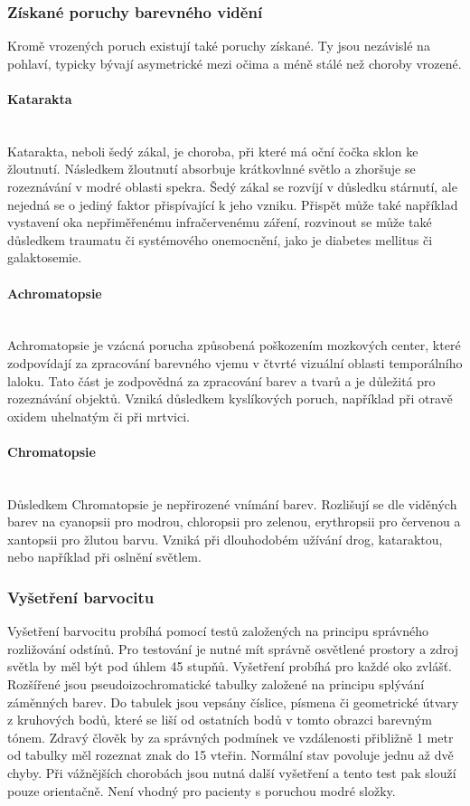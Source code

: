 \subsubsection{Získané poruchy barevného vidění}
Kromě vrozených poruch existují také poruchy získané. Ty jsou nezávislé na pohlaví, typicky bývají asymetrické mezi očima a méně stálé než choroby vrozené. 
\paragraph{Katarakta}\mbox{}\\
Katarakta, neboli šedý zákal, je choroba, při které má oční čočka sklon ke žloutnutí. Následkem žloutnutí absorbuje krátkovlnné světlo a zhoršuje se rozeznávání
v modré oblasti spekra. Šedý zákal se rozvíjí v důsledku stárnutí, ale nejedná se o jediný faktor přispívající k jeho vzniku. Přispět může také například
vystavení oka nepřiměřenému infračervenému záření, rozvinout se může také důsledkem traumatu či systémového onemocnění, jako je diabetes mellitus či galaktosemie.
\paragraph{Achromatopsie}\mbox{}\\
Achromatopsie je vzácná porucha způsobená poškozením mozkových center, které zodpovídají za zpracování barevného vjemu v čtvrté vizuální oblasti temporálního
laloku. Tato část je zodpovědná za zpracování barev a tvarů a je důležitá pro rozeznávání objektů. Vzniká důsledkem kyslíkových poruch, například při otravě oxidem uhelnatým
či při mrtvici.
\paragraph{Chromatopsie}\mbox{}\\
Důsledkem Chromatopsie je nepřirozené vnímání barev. Rozlišují se dle viděných barev na cyanopsii pro modrou, chloropsii pro zelenou, erythropsii pro červenou a xantopsii
pro žlutou barvu. Vzniká při dlouhodobém užívání drog, kataraktou, nebo například při oslnění světlem. 

\subsubsection{Vyšetření barvocitu}
Vyšetření barvocitu probíhá pomocí testů založených na principu správného rozližování odstínů. Pro testování je nutné mít správně osvětlené prostory a zdroj světla by měl být pod úhlem
45 stupňů. Vyšetření probíhá pro každé oko zvlášť. Rozšířené jsou pseudoizochromatické tabulky založené na principu splývání záměnných barev. Do tabulek jsou vepsány číslice, písmena či 
geometrické útvary z kruhových bodů, které se liší od ostatních bodů v tomto obrazci barevným tónem. Zdravý člověk by za správných podmínek ve vzdálenosti přibližně
1 metr od tabulky měl rozeznat znak do 15 vteřin. Normální stav povoluje jednu až dvě chyby. Při vážnějších chorobách jsou nutná další vyšetření a tento test pak 
slouží pouze orientačně. Není vhodný pro pacienty s poruchou modré složky.

